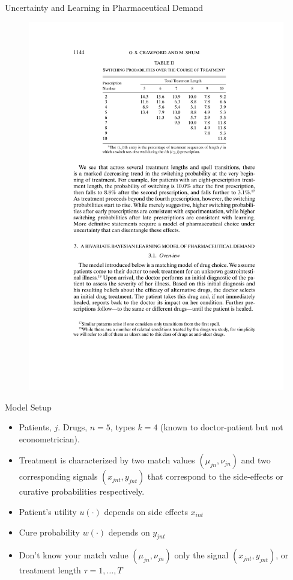 \documentclass[xcolor=pdftex,dvipsnames,table,mathserif,aspectratio=169]{beamer}
\begin{document}
\begin{frame}{Uncertainty and Learning in Pharmaceutical Demand}
\begin{figure}[htbp]
\begin{center}
\includegraphics{resources/crawfordshum1.pdf}
\label{default}
\end{center}
\end{figure}
\end{frame}

\begin{frame}{Model Setup}
\begin{itemize}
\item Patients, $j$. Drugs, $n=5$, types $k=4$ (known to doctor-patient but not econometrician).
\item Treatment is characterized by two match values $(\mu_{jn},\nu_{jn})$ and two corresponding signals $(x_{jnt},y_{jnt})$ that correspond to the side-effects or curative probabilities respectively.
\item Patient's utility $u(\cdot)$ depends on side effects $x_{int}$
\item Cure probability $w(\cdot)$ depends on $y_{jnt}$
\item Don't know your match value  $(\mu_{jn},\nu_{jn})$  only the signal $(x_{jnt},y_{jnt})$, or treatment length $\tau = 1,\ldots,T$
\end{itemize}
\end{frame}
\end{document}
